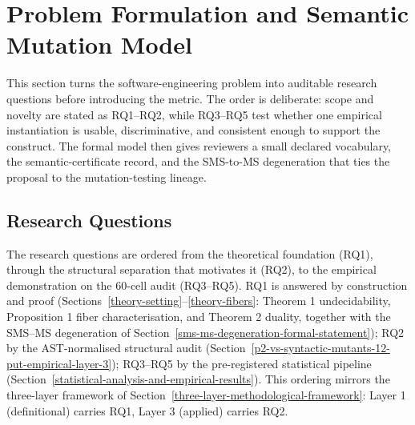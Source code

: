 \documentclass[12pt]{article}
\begin{document}
\section{Problem Formulation and Semantic Mutation Model}\label{research-questions-and-hypotheses}

This section turns the software-engineering problem into auditable
research questions before introducing the metric. The order is deliberate:
scope and novelty are stated as RQ1--RQ2, while RQ3--RQ5 test whether
one empirical instantiation is usable, discriminative, and consistent
enough to support the construct. The formal model then gives reviewers a
small declared vocabulary, the semantic-certificate record, and the
SMS-to-MS degeneration that ties the proposal to the mutation-testing
lineage.

\subsection{Research Questions}\label{research-questions}

The research questions are ordered from the theoretical foundation
(RQ1), through the structural separation that motivates it (RQ2), to the
empirical demonstration on the 60-cell audit (RQ3--RQ5). RQ1 is answered
by construction and proof (Sections~\ref{theory-setting}--\ref{theory-fibers}: Theorem 1 undecidability,
Proposition 1 fiber characterisation, and Theorem 2 duality, together
with the SMS--MS degeneration of Section~\ref{sms-ms-degeneration-formal-statement}); RQ2 by the
AST-normalised structural audit (Section~\ref{p2-vs-syntactic-mutants-12-put-empirical-layer-3}); RQ3--RQ5 by the pre-registered
statistical pipeline (Section~\ref{statistical-analysis-and-empirical-results}). This ordering mirrors the three-layer
framework of Section~\ref{three-layer-methodological-framework}: Layer 1 (definitional) carries RQ1, Layer 3 (applied)
carries RQ2.
\end{document}
